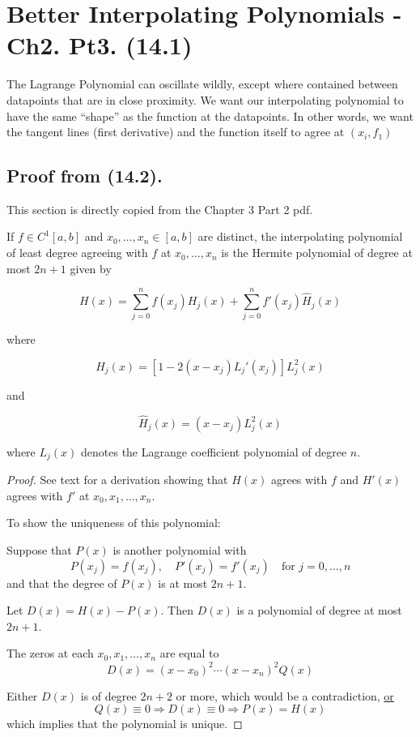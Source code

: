 \section{Better Interpolating Polynomials - Ch2. Pt3. (14.1)}

The Lagrange Polynomial can oscillate wildly, except where contained between
datapoints that are in close proximity. We want our interpolating polynomial to
have the same \enquote{shape} as the function at the datapoints. In other words,
we want the tangent lines (first derivative) and the function itself to agree at
$(x_i, f_1)$

\subsection{Proof from (14.2).} 

This section is directly copied from the Chapter 3 Part 2 pdf.

\thm
If \( f \in C^1[a,b] \) and \( x_0, \ldots, x_n \in [a,b] \) are distinct, the interpolating polynomial of least degree agreeing with \( f \) at \( x_0, \ldots, x_n \) is the Hermite polynomial of degree at most \( 2n+1 \) given by

\[
H(x) = \sum_{j=0}^{n} f(x_j) H_j(x) + \sum_{j=0}^{n} f'(x_j) \hat{H}_j(x)
\]

where

\[
H_j(x) = \left[1 - 2(x - x_j)L_j'(x_j)\right] L_j^2(x)
\]

and

\[
\hat{H}_j(x) = (x - x_j) L_j^2(x)
\]

where \( L_j(x) \) denotes the Lagrange coefficient polynomial of degree \( n \).

\begin{proof}
See text for a derivation showing that \( H(x) \) agrees with \( f \) and \( H'(x) \) agrees with \( f' \) at \( x_0, x_1, \ldots, x_n \).

To show the uniqueness of this polynomial:

Suppose that \( P(x) \) is another polynomial with
\[
P(x_{j}) = f(x_{j}), \quad P'(x_{j}) = f'(x_{j}) \quad \text{for } j = 0, \ldots, n
\]
and that the degree of \( P(x) \) is at most \( 2n+1 \).

Let \( D(x) = H(x) - P(x) \). Then \( D(x) \) is a polynomial of degree at most \( 2n+1 \).

The zeros at each \( x_0, x_1, \ldots, x_n \) are equal to
\[
D(x) = (x - x_0)^2 \cdots (x - x_n)^2 Q(x)
\]

Either \( D(x) \) is of degree \( 2n + 2 \) or more, which would be a contradiction, 
\uline{or}
\[
Q(x) \equiv 0 \Rightarrow D(x) \equiv 0 \Rightarrow P(x) = H(x)
\]
which implies that the polynomial is unique.
\end{proof}

